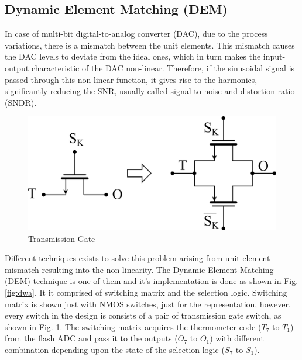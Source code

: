 \subsection{Dynamic Element Matching (DEM)}
In case of multi-bit digital-to-analog converter (DAC), due to the process variations, there is a mismatch between the unit elements. This mismatch causes the DAC levels to deviate from the ideal ones, which in turn makes the input-output characteristic of the DAC non-linear. Therefore, if the sinusoidal signal is passed through this non-linear function, it gives rise to the harmonics, significantly reducing the SNR, usually called signal-to-noise and distortion ratio (SNDR).
%
\begin{figure}[h!]
\centering
\includegraphics[width=0.5\columnwidth]{Chap05/Figures/transmission_gate.png}
\caption{Transmission Gate}
\label{fig:trans_gate}
\end{figure}
%
Different techniques exists to solve this problem arising from unit element mismatch resulting into the non-linearity. The Dynamic Element Matching (DEM) technique is one of them and it's implementation is done as shown in Fig. \ref{fig:dwa}. It it comprised of switching matrix and the selection logic. Switching matrix is shown just with NMOS switches, just for the representation, however, every switch in the design is consists of a pair of transmission gate switch, as shown in Fig. \ref{fig:trans_gate}. The switching matrix acquires the thermometer code ($T_7$ to $T_1$) from the flash ADC and pass it to the outputs ($O_7$ to $O_1$) with different combination depending upon the state of the selection logic ($S_7$ to $S_1$).
%
